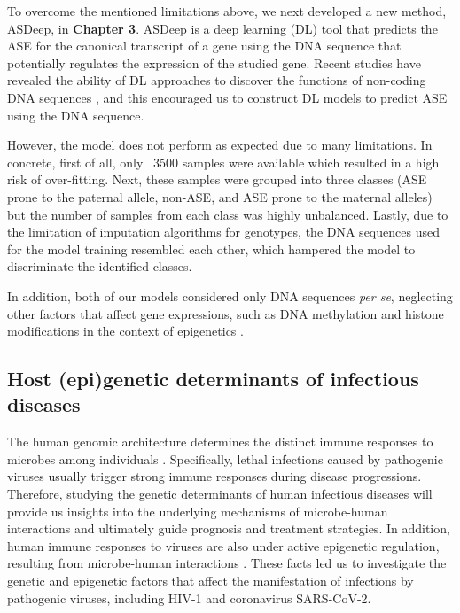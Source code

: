 \documentclass{book}
\begin{document}
\begin{refsection}
To overcome the mentioned limitations above,  we next developed a new method, ASDeep, in \textbf{Chapter 3}.
ASDeep is a deep learning (DL) tool that predicts the ASE for the canonical transcript of a gene using the DNA sequence that potentially regulates the expression of the studied gene.
Recent studies have revealed the ability of DL approaches to discover the functions of non-coding DNA sequences \cite{Angermueller2017DeepCpG,Alipanahi2015Predicting,Jaganathan2019Predicting,Dai2017Sequence2Vec}, and this encouraged us to construct DL models to predict ASE using the DNA sequence.

However, the model does not perform as expected due to many limitations.
In concrete, first of all, only ~3500 samples were available which resulted in a high risk of over-fitting.
Next, these samples were grouped into three classes (ASE prone to the paternal allele, non-ASE, and ASE prone to the maternal alleles) but the number of samples from each class was highly unbalanced.
Lastly, due to the limitation of imputation algorithms for genotypes, the DNA sequences used for the model training resembled each other, which hampered the model to discriminate the identified classes.

In addition, both of our models considered only DNA sequences \textit{per se}, neglecting other factors that affect gene expressions, such as DNA methylation and histone modifications in the context of epigenetics \cite{Onuchic2018Allele}.

\subsection*{Host (epi)genetic determinants of infectious diseases}
The human genomic architecture determines the distinct immune responses to microbes among individuals \cite{Li2016A,Li2016Inter}.
Specifically, lethal infections caused by pathogenic viruses usually trigger strong immune responses during disease progressions.
Therefore, studying the genetic determinants of human infectious diseases will provide us insights into the underlying mechanisms of microbe-human interactions and ultimately guide prognosis and treatment strategies.
In addition, human immune responses to viruses are also under active epigenetic regulation, resulting from microbe-human interactions \cite{Lange2020Epigenetic}.
These facts led us to investigate the genetic and epigenetic factors that affect the manifestation of infections by pathogenic viruses, including HIV-1 and coronavirus SARS-CoV-2.


\end{refsection}
\end{document}
